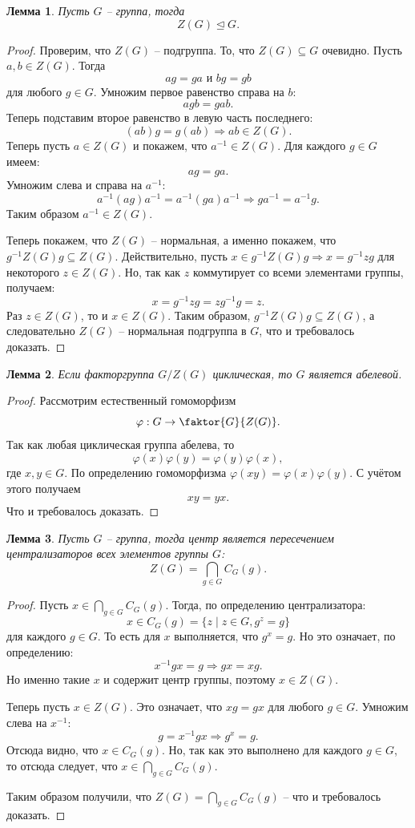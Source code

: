 \documentclass{article}
\newtheorem{lemma}{Лемма}[section]
\begin{document}
\begin{lemma}
    Пусть $G$ -- группа, тогда $$ Z(G) \trianglelefteq G. $$
\end{lemma}
\begin{proof}
    Проверим, что $Z(G)$ -- подгруппа. То, что $Z(G) \subseteq G$ очевидно. Пусть $a, b \in Z(G)$. Тогда $$ag = ga \text{ и } bg = gb$$ для любого $g \in G$. Умножим первое равенство справа на $b$: $$ agb = gab. $$ Теперь подставим второе равенство в левую часть последнего: $$ (ab)g = g(ab) \Rightarrow ab \in Z(G). $$
    Теперь пусть $a \in Z(G)$ и покажем, что $a^{-1} \in Z(G)$. Для каждого $g \in G$ имеем: $$ ag = ga. $$ Умножим слева и справа на $a^{-1}$: $$ a^{-1} (ag) a^{-1} = a^{-1} (ga) a^{-1} \Rightarrow g a^{-1} = a^{-1} g. $$ Таким образом $a^{-1} \in Z(G)$.

    Теперь покажем, что $Z(G)$ -- нормальная, а именно покажем, что $ g^{-1} Z(G) g \subseteq Z(G) $. Действительно, пусть $x \in g^{-1} Z(G) g \Rightarrow x = g^{-1} z g$ для некоторого $z \in Z(G)$. Но, так как $z$ коммутирует со всеми элементами группы, получаем: $$ x = g^{-1} z g = z g^{-1} g = z. $$ Раз $z \in Z(G)$, то и $x \in Z(G)$. Таким образом, $ g^{-1} Z(G) g \subseteq Z(G) $, а следовательно $Z(G)$ -- нормальная подгруппа в $G$, что и требовалось доказать.
\end{proof}

\begin{lemma}
    Если факторгруппа $G/Z(G)$ циклическая, то $G$ является абелевой.
\end{lemma}
\begin{proof}
    Рассмотрим естественный гомоморфизм $$ \varphi: G \rightarrow \faktor{G}{Z(G)}. $$ Так как любая циклическая группа абелева, то $$ \varphi(x) \varphi(y) = \varphi(y) \varphi(x), $$ где $x,y \in G$. По определению гомоморфизма $\varphi(xy) = \varphi(x) \varphi(y)$. С учётом этого получаем $$ xy = yx. $$ Что и требовалось доказать.
\end{proof}

\begin{lemma}
    Пусть $G$ -- группа, тогда центр является пересечением централизаторов всех элементов группы $G$: $$ Z(G) = \bigcap_{g \in G} C_G(g). $$
\end{lemma}
\begin{proof}
    Пусть $x \in \bigcap_{g \in G} C_G(g)$. Тогда, по определению централизатора: $$ x\in C_G(g) = \{ z \mid z \in G, g^z = g \} $$ для каждого $g \in G$. То есть для $x$ выполняется, что $g^x = g$. Но это означает, по определению: $$ x^{-1} g x = g \Rightarrow gx = xg. $$ Но именно такие $x$ и содержит центр группы, поэтому $x \in Z(G)$.

    Теперь пусть $x \in Z(G)$. Это означает, что $xg = gx$ для любого $g \in G$. Умножим слева на $x^{-1}$: $$ g = x^{-1} g x \Rightarrow g^x = g. $$ Отсюда видно, что $x \in C_G(g)$. Но, так как это выполнено для каждого $g \in G$, то отсюда следует, что $x \in \bigcap_{g \in G} C_G(g)$.

    Таким образом получили, что $  Z(G) = \bigcap_{g \in G} C_G(g) $ -- что и требовалось доказать.
\end{proof}
\end{document}
